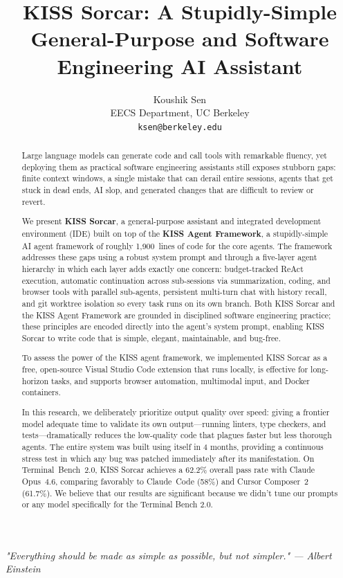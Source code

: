 \documentclass{article}
\title{KISS Sorcar: A Stupidly-Simple General-Purpose and Software Engineering AI Assistant}
\author{%
Koushik Sen \\ EECS Department, UC Berkeley\\ \texttt{ksen@berkeley.edu} \\ }
\begin{document}
\maketitle

\begin{center}
\textit{"Everything should be made as simple as possible, but not simpler." — Albert Einstein}
\end{center}


\begin{abstract}
Large language models can generate code and call tools with remarkable fluency, yet deploying them as practical software engineering assistants still exposes stubborn gaps: finite context windows, a single mistake that can derail entire sessions, agents that get stuck in dead ends, AI slop, and generated changes that are difficult to review or revert.

We present \textbf{KISS Sorcar}, a general-purpose assistant and integrated development environment (IDE) built on top of the \textbf{KISS Agent Framework}, a stupidly-simple AI agent framework of roughly 1,900~lines of code for the core agents.  The framework addresses these gaps using a robust system prompt and through a five-layer agent hierarchy in which each layer adds exactly one concern: budget-tracked ReAct execution, automatic continuation across sub-sessions via summarization, coding, and browser tools with parallel sub-agents, persistent multi-turn chat with history recall, and git worktree isolation so every task runs on its own branch.  Both KISS Sorcar and the KISS Agent Framework are grounded in disciplined software engineering practice; these principles are encoded directly into the agent's system prompt, enabling KISS Sorcar to write code that is simple, elegant, maintainable, and bug-free.

To assess the power of the KISS agent framework, we implemented KISS Sorcar as a free, open-source Visual Studio Code extension that runs locally, is effective for long-horizon tasks, and supports browser automation, multimodal input, and Docker containers.

In this research, we deliberately prioritize output quality over speed:  giving a frontier model adequate time to validate its own output---running linters, type checkers, and tests---dramatically reduces the low-quality code that plagues faster but less thorough agents.  The entire system was built using itself in 4 months, providing a continuous stress test in which any bug was patched immediately after its manifestation.  On Terminal~Bench~2.0, KISS Sorcar achieves a 62.2\% overall pass rate with Claude Opus~4.6, comparing favorably to Claude~Code (58\%) and Cursor Composer~2 (61.7\%).  We believe that our results are significant because we didn't tune our prompts or any model specifically for the Terminal Bench 2.0.
\end{abstract}
\end{document}
